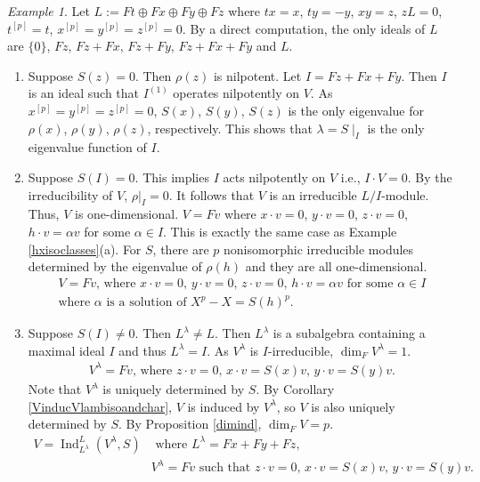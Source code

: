 \documentclass[12pt,MSc]{muthesis_2023}
\theoremstyle{plain}%
\theoremstyle{definition}
\theoremstyle{remark}
\newtheorem{Example}[FactCounter]{Example} %
\DeclareMathOperator{\Ind}{Ind}
\begin{document}
\begin{Example}
Let $L:= Ft\oplus Fx\oplus Fy \oplus Fz$ where $tx=x$, $ty=-y$, $xy=z$, $zL=0$, $t^{[p]}=t$, $x^{[p]}=y^{[p]}=z^{[p]}=0$. By a direct computation, the only ideals of $L$ are $\{0\}$, $Fz$, $Fz+Fx$, $Fz+Fy$, $Fz+Fx+Fy$ and $L$.

\begin{enumerate}
\item[(a)] Suppose $S(z)=0$. Then $\rho(z)$ is nilpotent. Let $I=Fz+Fx+Fy$. Then $I$ is an ideal such that $I^{(1)}$ operates nilpotently on $V$. As $x^{[p]}=y^{[p]}=z^{[p]}=0$, $S(x)$, $S(y)$, $S(z)$ is the only eigenvalue for $\rho(x)$, $\rho(y)$, $\rho(z)$, respectively. This shows that $\lambda=S\mid_I$ is the only eigenvalue function of $I$.

\item[(a.1)] Suppose $S(I)=0$. This implies $I$ acts nilpotently on $V$ i.e., $I\cdot V=0$. By the irreducibility of $V$, $\rho|_I=0$. It follows that $V$ is an irreducible $L/I$-module. Thus, $V$ is one-dimensional. $V=Fv$ where $x \cdot v=0$, $y\cdot v=0$, $z\cdot v=0$, $h\cdot v=\alpha v$ for some $\alpha\in I$. This is exactly the same case as Example \ref{hxisoclasses}(a). For $S$, there are $p$ nonisomorphic irreducible modules determined by the eigenvalue of $\rho(h)$ and they are all one-dimensional.
\begin{align*}
\text{$V=Fv$, where $x \cdot v=0$, $y\cdot v=0$, $z\cdot v=0$, $h\cdot v=\alpha v$ for some $\alpha\in I$}\\
\text{where $\alpha$ is a solution of $X^p-X={S(h)}^p$}.
\end{align*}

\item[(a.2)] Suppose $S(I)\neq 0$. Then $L^{\lambda}\neq L$. Then $L^{\lambda}$ is a subalgebra containing a maximal ideal $I$ and thus $L^{\lambda}=I$. As $V^{\lambda}$ is $I$-irreducible, $\dim_FV^{\lambda}=1$. 
\begin{align*}
\text{$V^{\lambda}=Fv$, where $z\cdot v=0$, $x \cdot v=S(x)v$, $y\cdot v =S(y)v$.}
\end{align*}
Note that $V^{\lambda}$ is uniquely determined by $S$. By Corollary \ref{VinducVlambisoandchar}, $V$ is induced by $V^{\lambda}$, so $V$ is also uniquely determined by $S$. By Proposition \ref{dimind}, $\dim_FV=p$.
\begin{align*}
\text{$V=\Ind^L_{L^{\lambda}}(V^{\lambda}, S)$}& \text{ where $L^{\lambda}=Fx+Fy+Fz$},\\
&\text{$V^{\lambda}=Fv$ such that $z\cdot v=0$, $x \cdot v=S(x)v$, $y\cdot v =S(y)v$.}
\end{align*}


\end{enumerate}
\end{Example}
\end{document}
